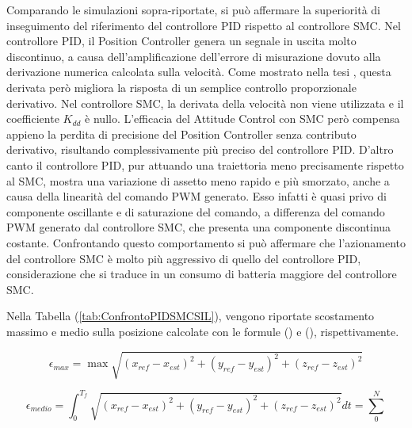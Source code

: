 Comparando le simulazioni sopra-riportate, si può affermare la superiorità di inseguimento del riferimento del controllore PID rispetto al controllore SMC. Nel controllore PID, il Position Controller genera un segnale in uscita molto discontinuo, a causa dell'amplificazione dell'errore di misurazione dovuto alla derivazione numerica calcolata sulla velocità. Come mostrato nella tesi \cite{DesTestCarm}, questa derivata però migliora la risposta di un semplice controllo proporzionale derivativo. Nel controllore SMC, la derivata della velocità non viene utilizzata e il coefficiente $K_{dd}$ è nullo. L'efficacia del Attitude Control con SMC però compensa appieno la perdita di precisione del Position Controller senza contributo derivativo, risultando complessivamente più preciso del controllore PID. D'altro canto il controllore PID, pur attuando una traiettoria meno precisamente rispetto al SMC, mostra una variazione di assetto meno rapido e più smorzato, anche a causa della linearità del comando PWM generato. Esso infatti è quasi privo di componente oscillante e di saturazione del comando, a differenza del comando PWM generato dal controllore SMC, che presenta una componente discontinua costante. Confrontando questo comportamento si può affermare che l'azionamento del controllore SMC è molto più aggressivo di quello del controllore PID, considerazione che si traduce in un consumo di batteria maggiore del controllore SMC.

Nella Tabella (\ref{tab:ConfrontoPIDSMCSIL}), vengono riportate scostamento massimo e medio sulla posizione calcolate con le formule () e (), rispettivamente.

\begin{equation}\label{key}
\epsilon_{max} = \max \sqrt{(x_{ref}-x_{est})^2+(y_{ref}-y_{est})^2+(z_{ref}-z_{est})^2}
\end{equation}

\begin{equation}\label{key}
\epsilon_{medio} = \int_{0}^{T_f} \sqrt{(x_{ref}-x_{est})^2+(y_{ref}-y_{est})^2+(z_{ref}-z_{est})^2} dt = \sum_{0}^{N}
\end{equation}


